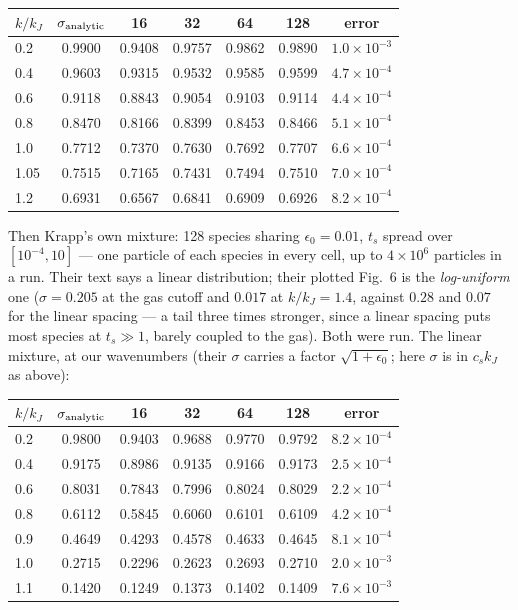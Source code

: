 \documentclass[11pt]{article}
\begin{document}
\begin{center}
\small
\begin{tabular}{@{}lcccccc@{}}
\toprule
$k/k_J$ & $\sigma_{\rm analytic}$ & 16 & 32 & 64 & 128 & error \\
\midrule
0.2 & 0.9900 & 0.9408 & 0.9757 & 0.9862 & 0.9890 & $1.0\times10^{-3}$ \\
0.4 & 0.9603 & 0.9315 & 0.9532 & 0.9585 & 0.9599 & $4.7\times10^{-4}$ \\
0.6 & 0.9118 & 0.8843 & 0.9054 & 0.9103 & 0.9114 & $4.4\times10^{-4}$ \\
0.8 & 0.8470 & 0.8166 & 0.8399 & 0.8453 & 0.8466 & $5.1\times10^{-4}$ \\
1.0 & 0.7712 & 0.7370 & 0.7630 & 0.7692 & 0.7707 & $6.6\times10^{-4}$ \\
1.05 & 0.7515 & 0.7165 & 0.7431 & 0.7494 & 0.7510 & $7.0\times10^{-4}$ \\
1.2 & 0.6931 & 0.6567 & 0.6841 & 0.6909 & 0.6926 & $8.2\times10^{-4}$ \\
\bottomrule
\end{tabular}
\end{center}

Then Krapp's own mixture: 128 species sharing $\epsilon_0 = 0.01$, $t_s$ spread over
$[10^{-4}, 10]$ --- one particle of each species in every cell, up to $4\times10^6$
particles in a run. Their text says a linear distribution; their plotted Fig.\ 6 is
the \emph{log-uniform} one ($\sigma = 0.205$ at the gas cutoff and $0.017$ at
$k/k_J = 1.4$, against $0.28$ and $0.07$ for the linear spacing --- a tail three times
stronger, since a linear spacing puts most species at $t_s \gg 1$, barely coupled to
the gas). Both were run. The linear mixture, at our wavenumbers (their $\sigma$ carries
a factor $\sqrt{1+\epsilon_0}$; here $\sigma$ is in $c_s k_J$ as above):

\begin{center}
\small
\begin{tabular}{@{}lcccccc@{}}
\toprule
$k/k_J$ & $\sigma_{\rm analytic}$ & 16 & 32 & 64 & 128 & error \\
\midrule
0.2 & 0.9800 & 0.9403 & 0.9688 & 0.9770 & 0.9792 & $8.2\times10^{-4}$ \\
0.4 & 0.9175 & 0.8986 & 0.9135 & 0.9166 & 0.9173 & $2.5\times10^{-4}$ \\
0.6 & 0.8031 & 0.7843 & 0.7996 & 0.8024 & 0.8029 & $2.2\times10^{-4}$ \\
0.8 & 0.6112 & 0.5845 & 0.6060 & 0.6101 & 0.6109 & $4.2\times10^{-4}$ \\
0.9 & 0.4649 & 0.4293 & 0.4578 & 0.4633 & 0.4645 & $8.1\times10^{-4}$ \\
1.0 & 0.2715 & 0.2296 & 0.2623 & 0.2693 & 0.2710 & $2.0\times10^{-3}$ \\
1.1 & 0.1420 & 0.1249 & 0.1373 & 0.1402 & 0.1409 & $7.6\times10^{-3}$ \\
\bottomrule
\end{tabular}
\end{center}
\end{document}
